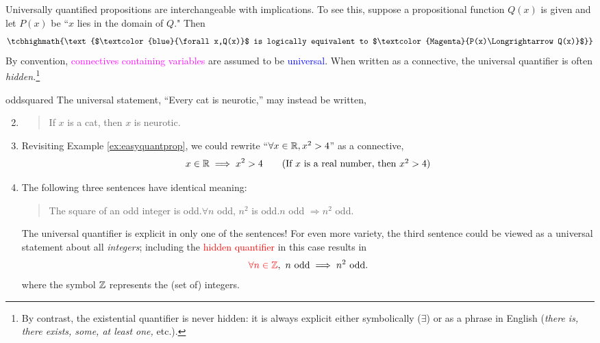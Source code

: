 \label{pg:univproof}

Universally quantified propositions are interchangeable with implications. To see this, suppose a propositional function $Q(x)$ is given and let $P(x)$ be ``$x$ lies in the domain of $Q$." Then
\[
	\tcbhighmath{\text{$\textcolor{blue}{\forall x,Q(x)}$ is logically equivalent to $\textcolor{Magenta}{P(x)\Longrightarrow Q(x)}$}}
\]
By convention, \textcolor{Magenta}{connectives containing variables} are assumed to be \textcolor{blue}{universal}. When written as a connective, the universal quantifier is often \emph{hidden.}\footnote{By contrast, the existential quantifier is never hidden: it is always explicit either symbolically ($\exists$) or as a phrase in English (\emph{there is, there exists, some, at least one,} etc.).}

\begin{examples}{}{oddsquared}
	\exstart The universal statement, ``Every cat is neurotic,'' may instead be written,
	\begin{enumerate}\setcounter{enumi}{1}
	  \item[]\begin{quote}
			If $x$ is a cat, then $x$ is neurotic.
		\end{quote} 
		
		\item\label{ex:easyquantprop2} Revisiting Example \ref{ex:easyquantprop}, we could rewrite ``$\forall x\in\mathbb{R}, x^2>4$'' as a connective,
		\[
			x\in\mathbb{R}\implies x^2>4 \tag{If $x$ is a real number, then $x^2>4$}
		\]
		
	  \item\label{ex:oddsquared2} The following three sentences have identical meaning:
	  \begin{quote}
	  	The square of an odd integer is odd.\qquad $\forall n$ odd, $n^2$ is odd.\qquad $n$ odd $\Longrightarrow n^2$ odd.
	  \end{quote}
	  The universal quantifier is explicit in only one of the sentences! For even more variety, the third sentence could be viewed as a universal statement about all \emph{integers}; including the \textcolor{red}{hidden quantifier} in this case results in
		\[
			\textcolor{red}{\forall n\in\mathbb{Z}},\ n\text{ odd} \implies n^2 \text{ odd.}
		\]
		where the symbol $\mathbb{Z}$ represents the (set of) integers.
	\end{enumerate}
\end{examples}

